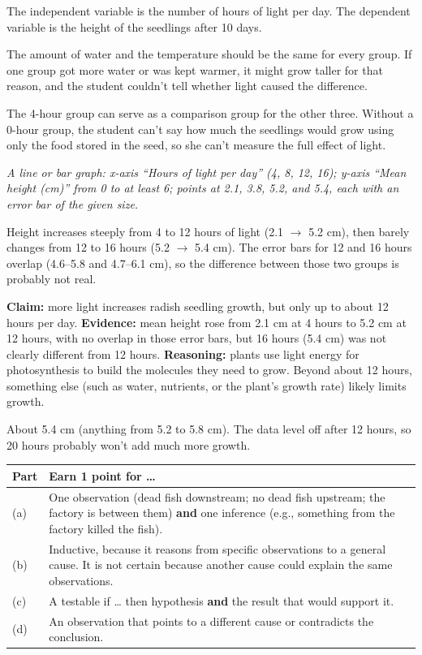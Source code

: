\documentclass[11pt,letterpaper]{article}
\begin{document}
\modelanswer
\begin{parts}
  \item The independent variable is the number of hours of light per day. The dependent variable is the height of the seedlings after 10 days.
  \item The amount of water and the temperature should be the same for every group. If one group got more water or was kept warmer, it might grow taller for that reason, and the student couldn't tell whether light caused the difference.
  \item The 4-hour group can serve as a comparison group for the other three. Without a 0-hour group, the student can't say how much the seedlings would grow using only the food stored in the seed, so she can't measure the full effect of light.
  \item \emph{A line or bar graph: x-axis ``Hours of light per day'' (4, 8, 12, 16); y-axis ``Mean height (cm)'' from 0 to at least 6; points at 2.1, 3.8, 5.2, and 5.4, each with an error bar of the given size.}
  \item Height increases steeply from 4 to 12 hours of light (2.1 $\rightarrow$ 5.2 cm), then barely changes from 12 to 16 hours (5.2 $\rightarrow$ 5.4 cm). The error bars for 12 and 16 hours overlap (4.6–5.8 and 4.7–6.1 cm), so the difference between those two groups is probably not real.
  \item \textbf{Claim:} more light increases radish seedling growth, but only up to about 12 hours per day. \textbf{Evidence:} mean height rose from 2.1 cm at 4 hours to 5.2 cm at 12 hours, with no overlap in those error bars, but 16 hours (5.4 cm) was not clearly different from 12 hours. \textbf{Reasoning:} plants use light energy for photosynthesis to build the molecules they need to grow. Beyond about 12 hours, something else (such as water, nutrients, or the plant's growth rate) likely limits growth.
  \item About 5.4 cm (anything from 5.2 to 5.8 cm). The data level off after 12 hours, so 20 hours probably won't add much more growth.
\end{parts}


\begin{center}
\begin{tabularx}{\linewidth}{@{}lY@{}}
\toprule
Part & Earn 1 point for \dots{} \\
\midrule
(a) & One observation (dead fish downstream; no dead fish upstream; the factory is between them) \textbf{and} one inference (e.g., something from the factory killed the fish). \\
(b) & Inductive, because it reasons from specific observations to a general cause. It is not certain because another cause could explain the same observations. \\
(c) & A testable if \dots{} then hypothesis \textbf{and} the result that would support it. \\
(d) & An observation that points to a different cause or contradicts the conclusion. \\
\bottomrule
\end{tabularx}
\end{center}
\end{document}
